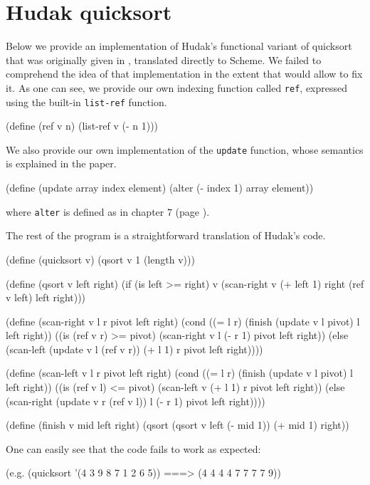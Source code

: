 \chapter{Hudak quicksort} \label{HudakQuicksort}

Below we provide an implementation of Hudak's functional
variant of quicksort that was originally given in \cite{Hudak1986},
translated directly to Scheme. We failed to comprehend
the idea of that implementation in the extent that would allow
to fix it. As one can see, we provide our own indexing function
called \texttt{ref}, expressed using the built-in \texttt{list-ref}
function.

\begin{Snippet}
  (define (ref v n)
    (list-ref v (- n 1)))
\end{Snippet}

We also provide our own implementation of the \texttt{update} function,
whose semantics is explained in the paper.

\begin{Snippet}
  (define (update array index element)
    (alter (- index 1) array element))
\end{Snippet}

where \texttt{alter} is defined as in chapter 7 (page \pageref{alter}).

The rest of the program is a straightforward translation of Hudak's
code.

\begin{Snippet}
  (define (quicksort v)
    (qsort v 1 (length v)))
\end{Snippet}
\begin{Snippet}
  (define (qsort v left right)
    (if (is left >= right)
	v
	(scan-right v            (+ left 1) right
                    (ref v left)       left right)))
\end{Snippet}
\begin{Snippet}
  (define (scan-right v l r pivot left right)
    (cond ((= l r)
           (finish (update v l pivot)
                   l left right))
	  ((is (ref v r) >= pivot)
	   (scan-right v l (- r 1) pivot left right))
	  (else
           (scan-left (update v l (ref v r))
                      (+ l 1) r pivot left right))))
\end{Snippet}
\begin{Snippet}
  (define (scan-left v l r pivot left right)
    (cond ((= l r)
	   (finish (update v l pivot)
                   l left right))
	  ((is (ref v l) <= pivot)
	   (scan-left v (+ l 1) r pivot left right))
	  (else 
	   (scan-right (update v r (ref v l))
                       l (- r 1) pivot left right))))
\end{Snippet}
\begin{Snippet}
  (define (finish v mid left right)
    (qsort (qsort v left (- mid 1)) (+ mid 1) right))
\end{Snippet}

One can easily see that the code fails to work as expected:

\begin{Snippet}
  (e.g.
   (quicksort '(4 3 9 8 7 1 2 6 5))
  ===> (4 4 4 4 7 7 7 7 9))
\end{Snippet}
